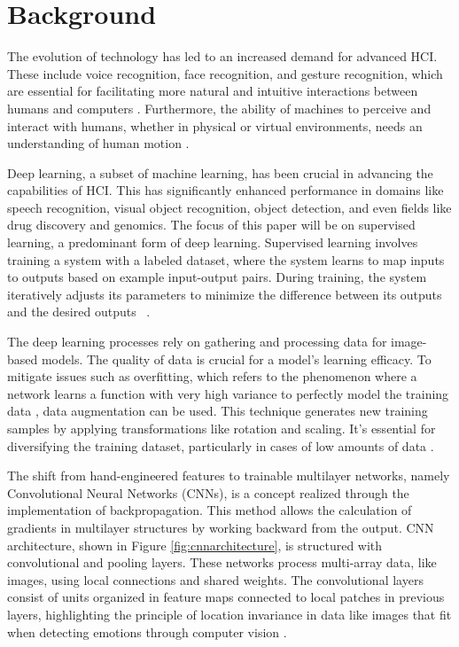 \documentclass[runningheads]{llncs}
\begin{document}
\section{Background}
\label{sec:background}

The evolution of technology has led to an increased demand for advanced HCI. These include voice recognition, face recognition, and gesture recognition, which are essential for facilitating more natural and intuitive interactions between humans and computers \cite{Alrowais2023}. Furthermore, the ability of machines to perceive and interact with humans, whether in physical or virtual environments, needs an understanding of human motion \cite{Martinez2017}.

Deep learning, a subset of machine learning, has been crucial in advancing the capabilities of HCI. This has significantly enhanced performance in domains like speech recognition, visual object recognition, object detection, and even fields like drug discovery and genomics. The focus of this paper will be on supervised learning, a predominant form of deep learning. Supervised learning involves training a system with a labeled dataset, where the system learns to map inputs to outputs based on example input-output pairs. During training, the system iteratively adjusts its parameters to minimize the difference between its outputs and the desired outputs \cite{Lecun2015}~\cite{Mahony2020}.

The deep learning processes rely on gathering and processing data for image-based models. The quality of data is crucial for a model's learning efficacy. To mitigate issues such as overfitting, which refers to the phenomenon where a network learns a function with very high variance to perfectly model the training data \cite{Shorten2019}, data augmentation can be used. This technique generates new training samples by applying transformations like rotation and scaling. It's essential for diversifying the training dataset, particularly in cases of low amounts of data \cite{Khalifa2022}.

The shift from hand-engineered features to trainable multilayer networks, namely Convolutional Neural Networks (CNNs), is a concept realized through the implementation of backpropagation. This method allows the calculation of gradients in multilayer structures by working backward from the output. CNN architecture, shown in Figure \ref{fig:cnnarchitecture}, is structured with convolutional and pooling layers. These networks process multi-array data, like images, using local connections and shared weights. The convolutional layers consist of units organized in feature maps connected to local patches in previous layers, highlighting the principle of location invariance in data like images that fit when detecting emotions through computer vision \cite{Lecun2015}.
\end{document}
